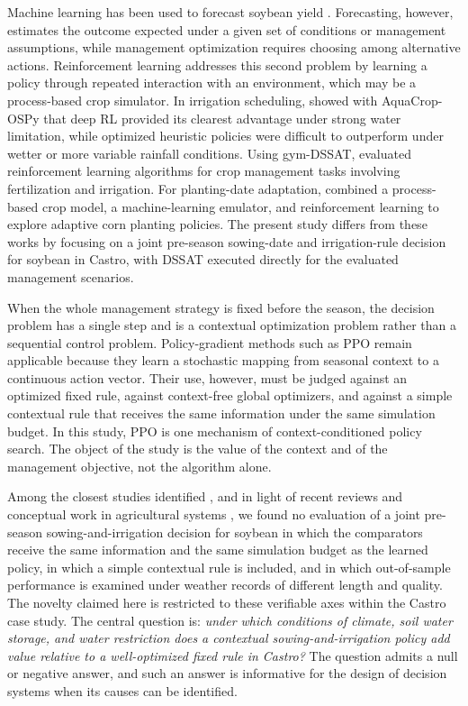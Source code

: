 \documentclass[times,final,authoryear]{elsarticle}
\begin{document}
Machine learning has been used to forecast soybean yield \citep{vonbloh2023mlsoybean, schwalbert2020soybeanforecast}. Forecasting, however, estimates the outcome expected under a given set of conditions or management assumptions, while management optimization requires choosing among alternative actions. Reinforcement learning addresses this second problem by learning a policy through repeated interaction with an environment, which may be a process-based crop simulator. In irrigation scheduling, \citet{kelly2024assessing} showed with AquaCrop-OSPy that deep RL provided its clearest advantage under strong water limitation, while optimized heuristic policies were difficult to outperform under wetter or more variable rainfall conditions. Using gym-DSSAT, \citet{balderas2025comparative} evaluated reinforcement learning algorithms for crop management tasks involving fertilization and irrigation. For planting-date adaptation, \citet{noa2026hybrid} combined a process-based crop model, a machine-learning emulator, and reinforcement learning to explore adaptive corn planting policies. The present study differs from these works by focusing on a joint pre-season sowing-date and irrigation-rule decision for soybean in Castro, with DSSAT executed directly for the evaluated management scenarios.

When the whole management strategy is fixed before the season, the decision problem has a single step and is a contextual optimization problem rather than a sequential control problem. Policy-gradient methods such as PPO remain applicable because they learn a stochastic mapping from seasonal context to a continuous action vector. Their use, however, must be judged against an optimized fixed rule, against context-free global optimizers, and against a simple contextual rule that receives the same information under the same simulation budget. In this study, PPO is one mechanism of context-conditioned policy search. The object of the study is the value of the context and of the management objective, not the algorithm alone.


Among the closest studies identified \citep{kelly2024assessing, balderas2025comparative, noa2026hybrid}, and in light of recent reviews and conceptual work in agricultural systems \citep{carolan2026objective, kumari2026optimization, adel2026drones}, we found no evaluation of a joint pre-season sowing-and-irrigation decision for soybean in which the comparators receive the same information and the same simulation budget as the learned policy, in which a simple contextual rule is included, and in which out-of-sample performance is examined under weather records of different length and quality. The novelty claimed here is restricted to these verifiable axes within the Castro case study. The central question is: \emph{under which conditions of climate, soil water storage, and water restriction does a contextual sowing-and-irrigation policy add value relative to a well-optimized fixed rule in Castro?} The question admits a null or negative answer, and such an answer is informative for the design of decision systems when its causes can be identified.
\end{document}
